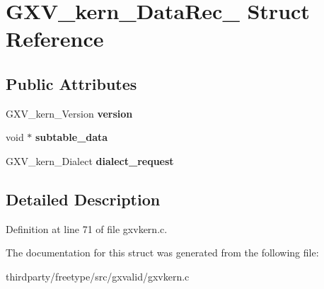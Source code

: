 \hypertarget{struct_g_x_v__kern___data_rec__}{}\section{G\+X\+V\+\_\+kern\+\_\+\+Data\+Rec\+\_\+ Struct Reference}
\label{struct_g_x_v__kern___data_rec__}
\subsection*{Public Attributes}
\begin{DoxyCompactItemize}
\item 
\mbox{\label{struct_g_x_v__kern___data_rec___acc740e7caa7e114f9ed6bd96138ef78a}} 
G\+X\+V\+\_\+kern\+\_\+\+Version {\bfseries version}
\item 
\mbox{\label{struct_g_x_v__kern___data_rec___ab5dcf10f27a725898ee4a0f686212927}} 
void $\ast$ {\bfseries subtable\+\_\+data}
\item 
\mbox{\label{struct_g_x_v__kern___data_rec___a5c2f0e725a0656d54578fa5b051bd210}} 
G\+X\+V\+\_\+kern\+\_\+\+Dialect {\bfseries dialect\+\_\+request}
\end{DoxyCompactItemize}


\subsection{Detailed Description}


Definition at line 71 of file gxvkern.\+c.



The documentation for this struct was generated from the following file\+:\begin{DoxyCompactItemize}
\item 
thirdparty/freetype/src/gxvalid/gxvkern.\+c\end{DoxyCompactItemize}
